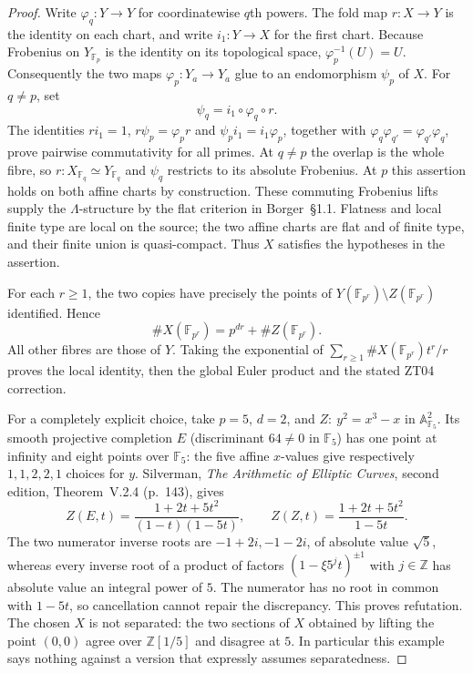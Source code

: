 \documentclass[11pt]{article}
\theoremstyle{remark}
\begin{document}
\begin{proof}
Write $\varphi_q:Y\to Y$ for coordinatewise $q$th powers.  The fold map
$r:X\to Y$ is the identity on each chart, and write $i_1:Y\to X$ for the
first chart.  Because Frobenius on $Y_{\mathbb F_p}$ is the identity on
its topological space, $\varphi_p^{-1}(U)=U$.  Consequently the two
maps $\varphi_p:Y_a\to Y_a$ glue to an endomorphism $\psi_p$ of $X$.
For $q\ne p$, set
\[
 \psi_q=i_1\circ\varphi_q\circ r.
\]
The identities $r i_1=1$, $r\psi_p=\varphi_p r$ and
$\psi_p i_1=i_1\varphi_p$, together with
$\varphi_q\varphi_{q'}=\varphi_{q'}\varphi_q$, prove pairwise
commutativity for all primes.  At $q\ne p$ the overlap is the whole
fibre, so $r:X_{\mathbb F_q}\simeq Y_{\mathbb F_q}$ and $\psi_q$
restricts to its absolute Frobenius.  At $p$ this assertion holds on
both affine charts by construction.  These commuting Frobenius lifts
supply the $\Lambda$-structure by the flat criterion in Borger~\S1.1.
Flatness and local finite type are local on the source; the two affine
charts are flat and of finite type, and their finite union is
quasi-compact.  Thus $X$ satisfies the hypotheses in the assertion.

For each $r\geq1$, the two copies have precisely the points of
$Y(\mathbb F_{p^r})\setminus Z(\mathbb F_{p^r})$ identified.  Hence
\[
 \#X(\mathbb F_{p^r})=p^{dr}+\#Z(\mathbb F_{p^r}).
\]
All other fibres are those of $Y$.  Taking the exponential of
$\sum_{r\geq1}\#X(\mathbb F_{p^r})t^r/r$ proves the local identity,
then the global Euler product and the stated ZT04 correction.

For a completely explicit choice, take $p=5$, $d=2$, and
$Z:\ y^2=x^3-x$ in $\mathbb A^2_{\mathbb F_5}$.  Its smooth projective
completion $E$ (discriminant $64\ne0$ in $\mathbb F_5$) has one
point at infinity and eight points over $\mathbb F_5$: the five affine $x$-values give respectively
$1,1,2,2,1$ choices for $y$.  Silverman, \emph{The Arithmetic of Elliptic Curves}, second edition,
Theorem~V.2.4 (p.~143), gives
\[
 Z(E,t)=\frac{1+2t+5t^2}{(1-t)(1-5t)},\qquad
 Z(Z,t)=\frac{1+2t+5t^2}{1-5t}.
\]
The two numerator inverse roots are $-1+2i,-1-2i$, of absolute value
$\sqrt5$, whereas every inverse root of a product of factors
$(1-\xi5^jt)^{\pm1}$ with $j\in\mathbb Z$ has absolute value an
integral power of $5$.  The numerator has no root in common with
$1-5t$, so cancellation cannot repair the discrepancy.  This proves
refutation.  The chosen $X$ is not separated: the two sections of $X$
obtained by lifting the point $(0,0)$ agree over $\mathbb Z[1/5]$ and
disagree at $5$.  In particular this example says nothing against a
version that expressly assumes separatedness.
\end{proof}
\end{document}
